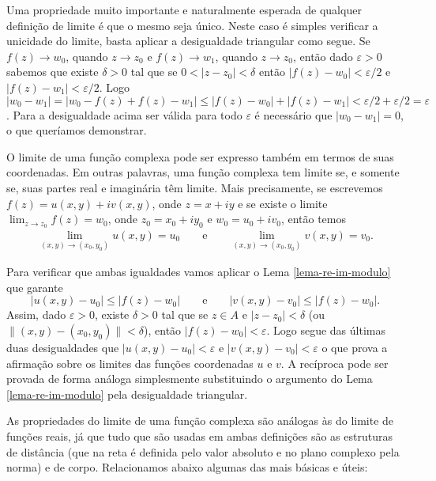Uma propriedade muito importante e naturalmente esperada de qualquer definição de limite é que o mesmo
seja único. Neste caso é simples verificar a unicidade do limite, basta aplicar a desigualdade triangular como
segue. Se $f(z)\to w_0$, quando $z\to z_0$ e $f(z)\to w_1$, quando $z\to z_0$, então dado $\varepsilon>0$
sabemos que existe $\delta>0$ tal que se $0<|z-z_0|<\delta$ 
então $|f(z)-w_0|<\varepsilon/2$ e $|f(z)-w_1|<\varepsilon/2$.
Logo $|w_0-w_1| = |w_0-f(z)+f(z)-w_1|\leq |f(z)-w_0|+|f(z)-w_1|<\varepsilon/2+\varepsilon/2 = \varepsilon$.
Para a desigualdade acima ser válida para todo $\varepsilon$ é necessário que $|w_0-w_1|=0$, o que queríamos
demonstrar.


\bigskip

O limite de uma função complexa pode ser expresso também em termos de suas coordenadas. Em outras palavras, 
uma função complexa tem limite se, e somente se, suas partes real e imaginária
têm limite. Mais precisamente, se escrevemos $f(z)=u(x,y)+iv(x,y)$, onde $z=x+iy$ e se existe 
o limite $\lim_{z\to z_0}f(z)=w_0$, onde $z_0=x_0+iy_0$ e $w_0=u_0+iv_0$, então temos
\begin{align*}
\lim_{(x,y)\to (x_0,y_0)} u(x,y) = u_0
\qquad\text{e}\qquad 
\lim_{(x,y)\to (x_0,y_0)} v(x,y) = v_0.
\end{align*}

Para verificar que ambas igualdades vamos aplicar o Lema \ref{lema-re-im-modulo} que 
garante
\[
|u(x,y)-u_0|\leqslant |f(z)-w_0|
\qquad \text{e}\qquad 
|v(x,y)-v_0|\leqslant |f(z)-w_0|.
\]
Assim, dado $\varepsilon>0$, existe $\delta>0$ tal que 
se $z\in A$ e  $|z-z_0|<\delta$ (ou  $\|(x,y)-(x_0,y_0)\|<\delta$), 
então $|f(z)-w_0|<\varepsilon$. Logo segue das últimas duas desigualdades que $|u(x,y)-u_0|<\varepsilon$
e $|v(x,y)-v_0|<\varepsilon$ o que prova a afirmação sobre os limites das funções coordenadas $u$ e $v$.
A recíproca pode ser provada de forma análoga simplesmente substituindo o argumento do Lema \ref{lema-re-im-modulo}
pela desigualdade triangular.

As propriedades do limite de uma função complexa são análogas às do limite de funções reais, já que 
tudo que são usadas em ambas definições são as estruturas de distância (que na reta é definida pelo valor absoluto e no 
plano complexo pela norma) e de corpo. Relacionamos abaixo algumas das mais básicas e úteis:


